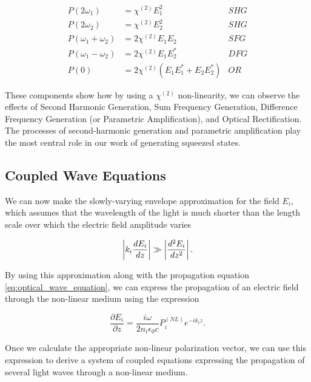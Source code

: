 \begin{eqnarray}
  \label{eq:second_components}
  P(2 \omega_1 ) & =  \chi^{(2)} E^2_1    &  SHG \\
  P(2 \omega_2 ) & =  \chi^{(2)} E^2_2    &  SHG \\
  P(\omega_1 + \omega_2 ) & =  2\chi^{(2)} E_1E_2    &  SFG \\
  P(\omega_1 - \omega_2 ) & =  2\chi^{(2)} E_1E^*_2    &  DFG \\
  P(0) & =  2\chi^{(2)} ( E_1E^*_1 + E_2E^*_2)   &  OR
\end{eqnarray}

\noindent
These components show how by using a $\chi^{(2)}$ non-linearity, we can observe the effects of Second Harmonic Generation, Sum Frequency Generation, Difference Frequency Generation (or Parametric Amplification), and Optical Rectification.  The processes of second-harmonic generation and parametric amplification play the most central role in our work of generating squeezed states.




\subsection{Coupled Wave Equations}
\label{coupled_wave_equations} 

We can now make the slowly-varying envelope approximation for the field $E_i$, which assumes that the wavelength of the light is much shorter than the length scale over which the electric field amplitude varies \cite{fox2006quantum}

\begin{equation}
  \label{eq:paraxial_approximation}
  \left| k_i \frac{d E_i}{d z}  \right| \gg  \left| \frac{d^2 E_i}{d z^2}  \right|.
\end{equation}

\noindent
By using this approximation along with the propagation equation \ref{eq:optical_wave_equation}, we can express the propagation of an electric field through the non-linear medium using the expression \cite{shen1984principles} 

\begin{equation}
  \label{eq:general_coupled_wave}
  \frac{\partial E_i}{\partial z} = \frac{i \omega }{2n_i \epsilon_0 c} P^{(NL)}_i e^{-ik_iz}.
\end{equation}

\noindent
Once we calculate the appropriate non-linear polarization vector, we can use this expression to derive a system of coupled equations expressing the propagation of several light waves through a non-linear medium.


